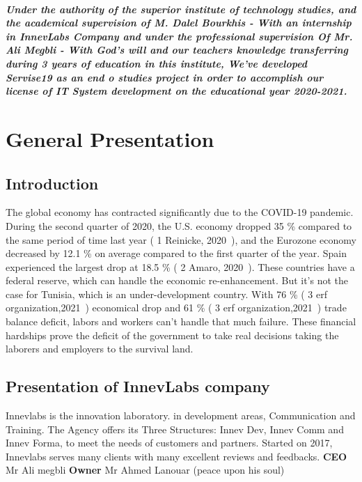 \documentclass[12pt]{report}
\begin{document}
\paragraph{\normalfont Under the authority of the superior institute of technology studies, and the academical supervision of M. Dalel Bourkhis - With an internship in InnevLabs Company and under the professional supervision
Of Mr. Ali Megbli - With God’s will and our teachers knowledge transferring during 3 years of education in this institute, We’ve developed Servise19 as an end o studies project in order to accomplish our license of IT System development on the educational year 2020-2021.}

\chapter{General Presentation}
\renewcommand{\thesection}{\arabic{section}}
\setcounter{secnumdepth}{3}


\section*{Introduction}

The global economy has contracted significantly due to the COVID-19 pandemic. During the second quarter of 2020, the U.S. economy dropped 35 \% compared to the same period of time last year ( 1 Reinicke, 2020~\cite{one}), and the Eurozone economy decreased by 12.1 \% on average compared to the first quarter of the year. Spain experienced the largest drop at 18.5 \% ( 2 Amaro, 2020~\cite{two}). These countries have a federal reserve, which can handle the economic re-enhancement. But it's not the case for Tunisia, which is an under-development country. With 76 \% ( 3 erf organization,2021~\cite{three}) economical drop and 61 \% ( 3 erf organization,2021~\cite{three}) trade balance deficit, labors and workers can't handle that much failure.
These financial hardships prove the deficit of the government to take real decisions taking the laborers and employers to the survival land.










\section{Presentation of InnevLabs company}
Innevlabs is the innovation laboratory.
in development areas,
Communication and Training.
The Agency offers its Three Structures:
Innev Dev, Innev Comm and Innev Forma, to meet the needs of customers and partners.
Started on 2017, Innevlabs serves many clients with many excellent reviews and feedbacks.
\textbf{CEO}  Mr Ali megbli \newline
\textbf{Owner} Mr Ahmed Lanouar (peace upon his soul)\newline 
\end{document}
